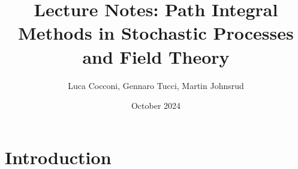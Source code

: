 \documentclass{article}
\title{Lecture Notes: Path Integral Methods in Stochastic Processes and Field Theory}
\author{Luca Cocconi, Gennaro Tucci, Martin Johnsrud}
\date{October 2024}
\begin{document}
\maketitle

\section{Introduction}
\end{document}
